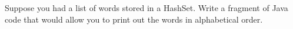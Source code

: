 \documentclass[11pt,letter]{exam}
\begin{document}
\begin{questions}


\question[10]
Suppose you had a list of words stored in a HashSet.  Write a fragment
of Java code that would allow you to print out the words in
alphabetical order.

\end{questions}
\end{document}
